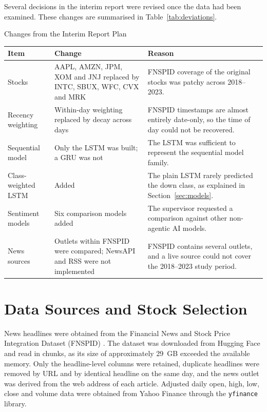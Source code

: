 Several decisions in the interim report were revised once the data had been examined. These changes are summarised in Table~\ref{tab:deviations}.

\begin{utptable}{Changes from the Interim Report Plan}
\label{tab:deviations}
\begin{tabular}{@{}P{3.0cm}P{4.0cm}P{6.6cm}@{}}
\toprule
\textbf{Item} & \textbf{Change} & \textbf{Reason} \\
\midrule
Stocks & AAPL, AMZN, JPM, XOM and JNJ replaced by INTC, SBUX, WFC, CVX and MRK & FNSPID coverage of the original stocks was patchy across 2018--2023. \\
Recency weighting & Within-day weighting replaced by decay across days & FNSPID timestamps are almost entirely date-only, so the time of day could not be recovered. \\
Sequential model & Only the LSTM was built; a GRU was not & The LSTM was sufficient to represent the sequential model family. \\
Class-weighted LSTM & Added & The plain LSTM rarely predicted the down class, as explained in Section~\ref{sec:models}. \\
Sentiment models & Six comparison models added & The supervisor requested a comparison against other non-agentic AI models. \\
News sources & Outlets within FNSPID were compared; NewsAPI and RSS were not implemented & FNSPID contains several outlets, and a live source could not cover the 2018--2023 study period. \\
\bottomrule
\end{tabular}
\end{utptable}

\section{Data Sources and Stock Selection}
\label{sec:data}
News headlines were obtained from the Financial News and Stock Price Integration Dataset (FNSPID) \parencite{dong2024fnspid}. The dataset was downloaded from Hugging Face and read in chunks, as its size of approximately 29~GB exceeded the available memory. Only the headline-level columns were retained, duplicate headlines were removed by URL and by identical headline on the same day, and the news outlet was derived from the web address of each article. Adjusted daily open, high, low, close and volume data were obtained from Yahoo Finance through the \texttt{yfinance} library.

